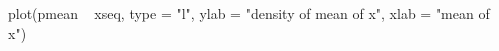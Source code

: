 \begin{Schunk}
\begin{Sinput}
  plot(pmean ~ xseq, type = "l", ylab = "density of mean of x", xlab = "mean of x")
\end{Sinput}
\end{Schunk}
